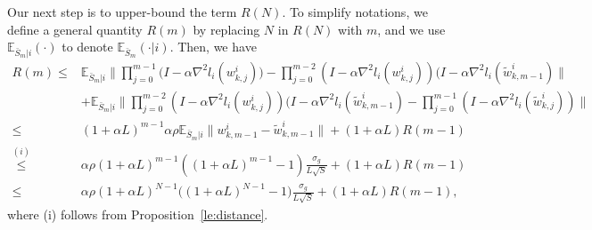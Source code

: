 \documentclass{osudissert96}
\begin{document}
	Our next step is to upper-bound the term $R(N)$. To simplify notations, we define a general quantity $R(m)$ by replacing $N$ in $R(N)$ with $m$,  and 
	we use $\mathbb{E}_{\bar S_m | i}(\cdot)$ to denote $\mathbb{E}_{\bar S_m}(\cdot| i)$. Then, we have 
	\begin{align}\label{eq:arjpp}
	R(m) \leq & \mathbb{E}_{\bar S_m| i}  \Big \|  \prod_{j=0}^{m-1}  \big(I - \alpha \nabla^2 l_i(w_{k,j}^i)\big) -   \prod_{j=0}^{m-2}(I-\alpha \nabla^2 l_i( w^i_{k,j})) (I-\alpha \nabla^2 l_i( \widetilde w^i_{k,m-1}) \Big  \| \nonumber
	\\ & + \mathbb{E}_{\bar S_m|i}  \Big \|  \prod_{j=0}^{m-2}(I-\alpha \nabla^2 l_i( w^i_{k,j})) (I-\alpha \nabla^2 l_i( \widetilde w^i_{k,m-1})  -  \prod_{j=0}^{m-1}(I-\alpha \nabla^2 l_i(\widetilde w^i_{k,j})) \Big  \| \nonumber
	\\\leq & (1+\alpha L)^{m-1} \alpha \rho\mathbb{E}_{\bar S_m|i} \|w_{k,m-1}^i - \widetilde w_{k,m-1}^i\| + (1+\alpha L) R(m-1) \nonumber
	\\\overset{(i)}\leq &  \alpha \rho (1+\alpha L)^{m-1} ( (1+\alpha L)^{m-1} -1 )\frac{\sigma_g}{L\sqrt{S}} + (1+\alpha L) R(m-1) \nonumber
	\\ \leq& \alpha \rho (1+\alpha L)^{N-1} \big( (1+\alpha L)^{N-1} -1  \big)\frac{\sigma_g}{L\sqrt{S}}  +  (1+\alpha L) R(m-1),
	\end{align}
	where (i) follows from Proposition~\ref{le:distance}. 
\end{document}

